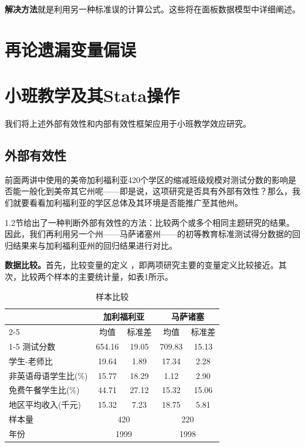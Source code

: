 \documentclass[cn,12pt,math=newtx,citestyle=gb7714-2015,bibstyle=gb7714-2015]{elegantbook}
\begin{document}
\textbf{解决方法}就是利用另一种标准误的计算公式。这些将在面板数据模型中详细阐述。

\section{再论遗漏变量偏误}



\section{小班教学及其Stata操作}
我们将上述外部有效性和内部有效性框架应用于小班教学效应研究。

\subsection{外部有效性}
前面两讲中使用的美帝加利福利亚420个学区的缩减班级规模对测试分数的影响是否能一般化到美帝其它州呢——即是说，这项研究是否具有外部有效性？那么，我们就要看看加利福利亚的学区总体及其环境是否能推广至其他州。

1.2节给出了一种判断外部有效性的方法：比较两个或多个相同主题研究的结果。因此，我们再利用另一个州——马萨诸塞州——的初等教育标准测试得分数据的回归结果来与加利福利亚州的回归结果进行对比。

\textbf{数据比较。}首先，比较变量的定义 ，即两项研究主要的变量定义比较接近。其次，比较两个样本的主要统计量，如表1所示。
\begin{center}
	\begin{table}[!h]
		\caption{样本比较}\label{tab:digit}
		\begin{center}
			\begin{tabular}{lcccc}
				\hline
				&\multicolumn{2}{c}{加利福利亚}&\multicolumn{2}{c}{马萨诸塞}\\
				\cline{2-5}
				&均值&标准差&均值&标准差\\
				\cline{1-5}
				测试分数&654.16&19.05&709.83&15.13\\
				学生-老师比&19.64&1.89&17.34&2.28\\
				非英语母语学生比(\%)&15.77&18.29&1.12&2.90\\
				免费午餐学生比(\%)&44.71&27.12&15.32&15.06\\
				地区平均收入(千元)&15.32&7.23&18.75&5.81\\
				样本量&\multicolumn{2}{c}{420}&\multicolumn{2}{c}{220}\\
				年份&\multicolumn{2}{c}{1999}&\multicolumn{2}{c}{1998}\\
				\hline
			\end{tabular}
		\end{center}
	\end{table}
\end{center}
\end{document}
